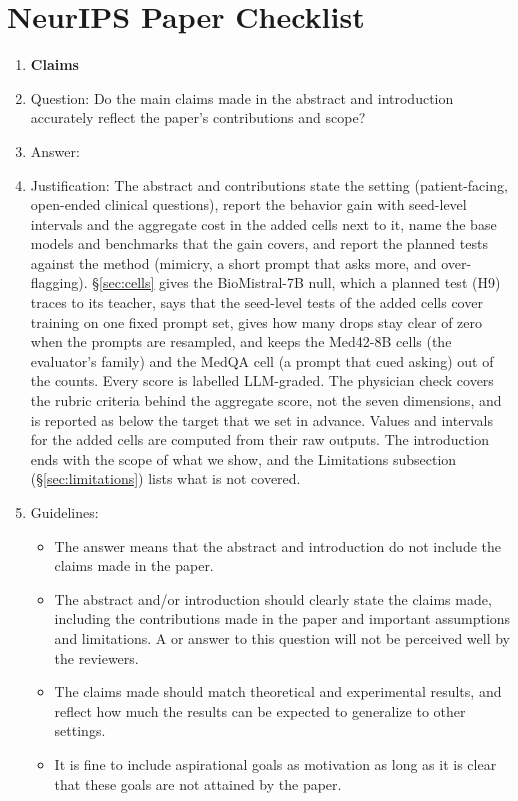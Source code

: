 \section*{NeurIPS Paper Checklist}

\begin{enumerate}

\item {\bf Claims}
    \item[] Question: Do the main claims made in the abstract and introduction accurately reflect the paper's contributions and scope?
    \item[] Answer: \answerYes{}
    \item[] Justification: The abstract and contributions state the setting (patient-facing, open-ended clinical questions), report the behavior gain with seed-level intervals and the aggregate cost in the added cells next to it, name the base models and benchmarks that the gain covers, and report the planned tests against the method (mimicry, a short prompt that asks more, and over-flagging). \S\ref{sec:cells} gives the BioMistral-7B null, which a planned test (H9) traces to its teacher, says that the seed-level tests of the added cells cover training on one fixed prompt set, gives how many drops stay clear of zero when the prompts are resampled, and keeps the Med42-8B cells (the evaluator's family) and the MedQA cell (a prompt that cued asking) out of the counts. Every score is labelled LLM-graded. The physician check covers the rubric criteria behind the aggregate score, not the seven dimensions, and is reported as below the target that we set in advance. Values and intervals for the added cells are computed from their raw outputs. The introduction ends with the scope of what we show, and the Limitations subsection (\S\ref{sec:limitations}) lists what is not covered.
    \item[] Guidelines:
    \begin{itemize}
        \item The answer \answerNA{} means that the abstract and introduction do not include the claims made in the paper.
        \item The abstract and/or introduction should clearly state the claims made, including the contributions made in the paper and important assumptions and limitations. A \answerNo{} or \answerNA{} answer to this question will not be perceived well by the reviewers.
        \item The claims made should match theoretical and experimental results, and reflect how much the results can be expected to generalize to other settings.
        \item It is fine to include aspirational goals as motivation as long as it is clear that these goals are not attained by the paper.
    \end{itemize}


\end{enumerate}
